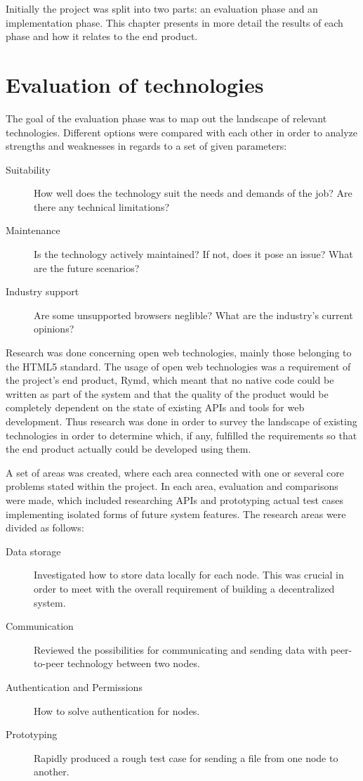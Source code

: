 Initially the project was split into two parts: an evaluation phase and an implementation phase. This chapter presents in more detail the results of each phase and how it relates to the end product.

\section{Evaluation of technologies}

The goal of the evaluation phase was to map out the landscape of relevant technologies. Different options were compared  with each other in order to analyze strengths and weaknesses in regards to a set of given parameters:

\begin{description}
  \item[Suitability] How well does the technology suit the needs and demands of the job? Are there any technical limitations?
  \item[Maintenance] Is the technology actively maintained? If not, does it pose an issue? What are the future scenarios?
  \item[Industry support] Are some unsupported browsers neglible? What are the industry's current opinions?
\end{description}

Research was done concerning open web technologies, mainly those belonging to the HTML5 standard. The usage of open web technologies was a requirement of the project's end product, Rymd, which meant that no native code could be written as part of the system and that the quality of the product would be completely dependent on the state of existing APIs and tools for web development. Thus research was done in order to survey the landscape of existing technologies in order to determine which, if any, fulfilled the requirements so that the end product actually could be developed using them.

A set of areas was created, where each area connected with one or several core problems stated within the project. In each area, evaluation and comparisons were made, which included researching APIs and prototyping actual test cases implementing isolated forms of future system features. The research areas were divided as follows:

\begin{description}
\item[Data storage] Investigated how to store data locally for each node. This was crucial in order to meet with the overall requirement of building a decentralized system.
\item[Communication] Reviewed the possibilities for communicating and sending data with peer-to-peer technology between two nodes.
\item[Authentication and Permissions] How to solve authentication for nodes.
\item[Prototyping] Rapidly produced a rough test case for sending a file from one node to another.
\end{description}


